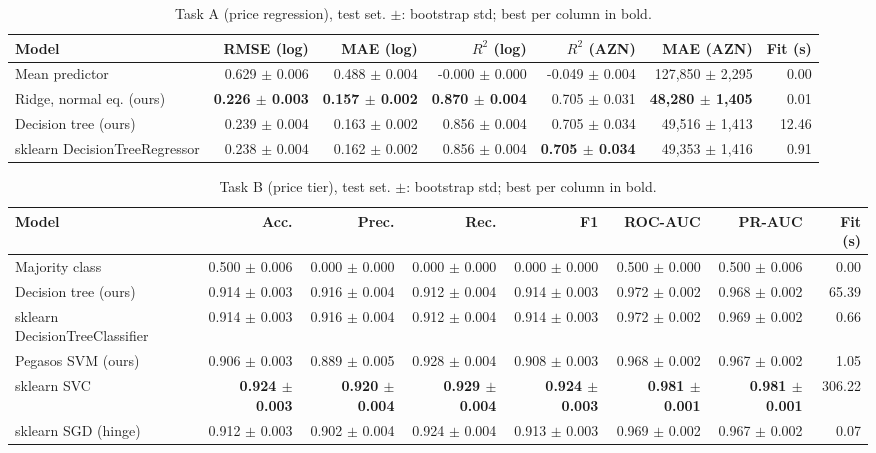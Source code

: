 \begin{table}[t]
\centering\small
\caption{Task A (price regression), test set. $\pm$: bootstrap std; best per column in bold.}\label{tab:results_a}
\begin{tabular}{lrrrrrr}
\toprule
Model & RMSE (log) & MAE (log) & $R^2$ (log) & $R^2$ (AZN) & MAE (AZN) & Fit (s) \\
\midrule
Mean predictor & 0.629 $\pm$ 0.006 & 0.488 $\pm$ 0.004 & -0.000 $\pm$ 0.000 & -0.049 $\pm$ 0.004 & 127,850 $\pm$ 2,295 & 0.00 \\
Ridge, normal eq. (ours) & \textbf{0.226 $\pm$ 0.003} & \textbf{0.157 $\pm$ 0.002} & \textbf{0.870 $\pm$ 0.004} & 0.705 $\pm$ 0.031 & \textbf{48,280 $\pm$ 1,405} & 0.01 \\
Decision tree (ours) & 0.239 $\pm$ 0.004 & 0.163 $\pm$ 0.002 & 0.856 $\pm$ 0.004 & 0.705 $\pm$ 0.034 & 49,516 $\pm$ 1,413 & 12.46 \\
sklearn DecisionTreeRegressor & 0.238 $\pm$ 0.004 & 0.162 $\pm$ 0.002 & 0.856 $\pm$ 0.004 & \textbf{0.705 $\pm$ 0.034} & 49,353 $\pm$ 1,416 & 0.91 \\
\bottomrule
\end{tabular}
\end{table}

\begin{table}[t]
\centering\small
\caption{Task B (price tier), test set. $\pm$: bootstrap std; best per column in bold.}\label{tab:results_b}
\begin{tabular}{lrrrrrrr}
\toprule
Model & Acc. & Prec. & Rec. & F1 & ROC-AUC & PR-AUC & Fit (s) \\
\midrule
Majority class & 0.500 $\pm$ 0.006 & 0.000 $\pm$ 0.000 & 0.000 $\pm$ 0.000 & 0.000 $\pm$ 0.000 & 0.500 $\pm$ 0.000 & 0.500 $\pm$ 0.006 & 0.00 \\
Decision tree (ours) & 0.914 $\pm$ 0.003 & 0.916 $\pm$ 0.004 & 0.912 $\pm$ 0.004 & 0.914 $\pm$ 0.003 & 0.972 $\pm$ 0.002 & 0.968 $\pm$ 0.002 & 65.39 \\
sklearn DecisionTreeClassifier & 0.914 $\pm$ 0.003 & 0.916 $\pm$ 0.004 & 0.912 $\pm$ 0.004 & 0.914 $\pm$ 0.003 & 0.972 $\pm$ 0.002 & 0.969 $\pm$ 0.002 & 0.66 \\
Pegasos SVM (ours) & 0.906 $\pm$ 0.003 & 0.889 $\pm$ 0.005 & 0.928 $\pm$ 0.004 & 0.908 $\pm$ 0.003 & 0.968 $\pm$ 0.002 & 0.967 $\pm$ 0.002 & 1.05 \\
sklearn SVC & \textbf{0.924 $\pm$ 0.003} & \textbf{0.920 $\pm$ 0.004} & \textbf{0.929 $\pm$ 0.004} & \textbf{0.924 $\pm$ 0.003} & \textbf{0.981 $\pm$ 0.001} & \textbf{0.981 $\pm$ 0.001} & 306.22 \\
sklearn SGD (hinge) & 0.912 $\pm$ 0.003 & 0.902 $\pm$ 0.004 & 0.924 $\pm$ 0.004 & 0.913 $\pm$ 0.003 & 0.969 $\pm$ 0.002 & 0.967 $\pm$ 0.002 & 0.07 \\
\bottomrule
\end{tabular}
\end{table}

